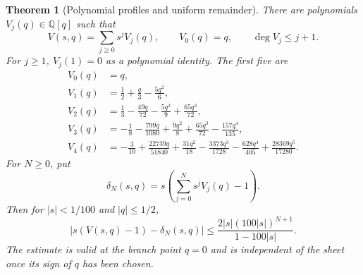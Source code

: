 \documentclass[11pt,a4paper]{article}
\newtheorem{theorem}{Theorem}[section]
\theoremstyle{definition}
\theoremstyle{remark}
\newcommand{\Q}{\mathbb Q}
\begin{document}
\begin{theorem}[Polynomial profiles and uniform remainder]
\label{thm:profiles}
There are polynomials $V_j(q)\in\Q[q]$ such that
\begin{equation}\label{eq:profile-series}
 V(s,q)=\sum_{j\ge0}s^jV_j(q),\qquad
 V_0(q)=q,\qquad \deg V_j\le j+1.
\end{equation}
For $j\ge1$, $V_j(1)=0$ as a polynomial identity. The first five are
\begin{align}
 V_0(q)&=q,\nonumber\\
 V_1(q)&=\frac12+\frac q3-\frac{5q^2}{6},\nonumber\\
 V_2(q)&=\frac13-\frac{49q}{72}-\frac{5q^2}{9}
                                      +\frac{65q^3}{72},\label{eq:profiles}\\
 V_3(q)&=-\frac18-\frac{799q}{1080}+\frac{9q^2}{8}
                     +\frac{65q^3}{72}-\frac{157q^4}{135},\nonumber\\
 V_4(q)&=-\frac3{10}+\frac{22739q}{51840}+\frac{31q^2}{18}
          -\frac{3373q^3}{1728}-\frac{628q^4}{405}
          +\frac{28369q^5}{17280}.\nonumber
\end{align}
For $N\ge0$, put
\begin{equation}\label{eq:delta-N}
 \delta_N(s,q)=s\left(\sum_{j=0}^{N}s^jV_j(q)-1\right).
\end{equation}
Then for $|s|<1/100$ and $|q|\le1/2$,
\begin{equation}\label{eq:uniform-error}
 \left|s(V(s,q)-1)-\delta_N(s,q)\right|
 \le\frac{2|s|(100|s|)^{N+1}}{1-100|s|}.
\end{equation}
The estimate is valid at the branch point $q=0$ and is independent of the
sheet once its sign of $q$ has been chosen.
\end{theorem}
\end{document}

